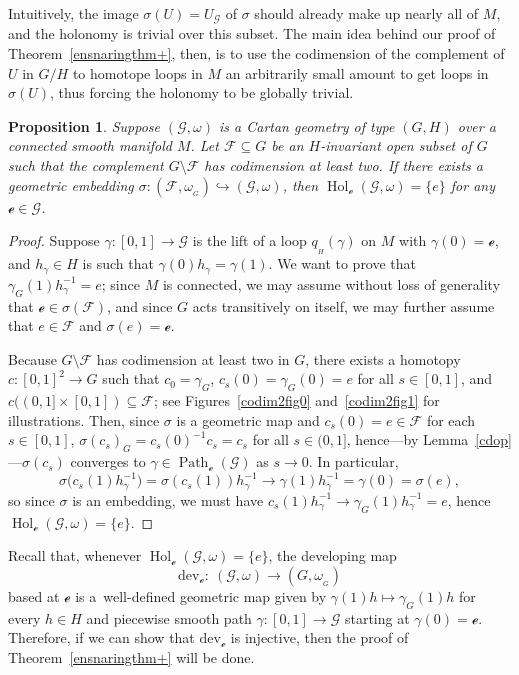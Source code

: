 \documentclass[10pt,a4paper]{amsart}
\numberwithin{equation}{section}
\newtheorem{Proposition}[Theorem]{Proposition}
\theoremstyle{definition}
\DeclareMathOperator{\Hol}{\mathrm{Hol}}
\DeclareMathOperator{\Path}{Path}
\newcommand{\MC}[1]{\omega_{{}_{#1}}}
\begin{document}
Intuitively, the image $\sigma(U)=U_\mathscr{G}$ of $\sigma$ should already make up nearly all of $M$, and the holonomy is trivial over this subset. The main idea behind our proof of Theorem~\ref{ensnaringthm+}, then, is to use the codimension of the complement of $U$ in $G/H$ to homotope loops in $M$ an arbitrarily small amount to get loops in $\sigma(U)$, thus forcing the holonomy to be globally trivial.

\begin{Proposition}\label{codim2}
Suppose $(\mathscr{G},\omega)$ is a Cartan geometry of type $(G,H)$ over a connected smooth manifold $M$. Let $\mathscr{F}\subseteq G$ be an $H$-invariant open subset of $G$ such that the complement $G\setminus\mathscr{F}$ has codimension at least two. If there exists a geometric embedding $\sigma\colon (\mathscr{F},\MC{G})\hookrightarrow (\mathscr{G},\omega)$, then $\Hol_\mathscr{e}(\mathscr{G},\omega)=\{e\}$ for any $\mathscr{e}\in\mathscr{G}$.
\end{Proposition}
\begin{proof}Suppose $\gamma \colon [0,1]\to\mathscr{G}$ is the lift of a loop $q_{{}_H}(\gamma)$ on $M$ with $\gamma(0)=\mathscr{e}$, and $h_\gamma\in H$ is such that $\gamma(0)h_\gamma=\gamma(1)$. We want to prove that $\gamma_G(1)h_\gamma^{-1}=e$; since $M$ is connected, we may assume without loss of generality that $\mathscr{e}\in\sigma(\mathscr{F})$, and since $G$ acts transitively on itself, we may further assume that $e\in\mathscr{F}$ and $\sigma(e)=\mathscr{e}$.

Because $G\setminus\mathscr{F}$ has codimension at least two in $G$, there exists a homotopy $c\colon [0,1]^2\to G$ such that $c_0=\gamma_G$, $c_s(0)=\gamma_G(0)=e$ for all $s\in[0,1]$, and $c((0,1]\times[0,1])\subseteq\mathscr{F}$; see Figures~\ref{codim2fig0} and~\ref{codim2fig1} for illustrations. Then, since $\sigma$ is a geometric map and $c_s(0)=e\in\mathscr{F}$ for each $s\in[0,1]$, $\sigma(c_s)_G=c_s(0)^{-1}c_s=c_s$ for all $s\in (0,1]$, hence---by Lemma~\ref{cdop}---$\sigma(c_s)$ converges to $\gamma\in\Path_\mathscr{e}(\mathscr{G})$ as $s\rightarrow 0$. In particular, \[\sigma\bigl(c_s(1)h_\gamma^{-1}\bigr)=\sigma(c_s(1))h_\gamma^{-1}\rightarrow\gamma(1)h_\gamma^{-1}=\gamma(0)=\sigma(e),\] so since $\sigma$ is an embedding, we must have $c_s(1)h_\gamma^{-1}\rightarrow\gamma_G(1)h_\gamma^{-1}=e$, hence $\Hol_\mathscr{e}(\mathscr{G},\omega)=\{e\}$.
\end{proof}

Recall that, whenever $\Hol_\mathscr{e}(\mathscr{G},\omega)=\{e\}$, the developing map \[\mathrm{dev}_\mathscr{e}\colon \ (\mathscr{G},\omega)\to(G,\MC{G})\] based at $\mathscr{e}$ is a~well-defined geometric map given by $\gamma(1)h\mapsto\gamma_G(1)h$ for every $h\in H$ and piecewise smooth path $\gamma \colon [0,1]\to\mathscr{G}$ starting at $\gamma(0)=\mathscr{e}$. Therefore, if we can show that $\mathrm{dev}_\mathscr{e}$ is injective, then the proof of Theorem~\ref{ensnaringthm+} will be done.
\end{document}
